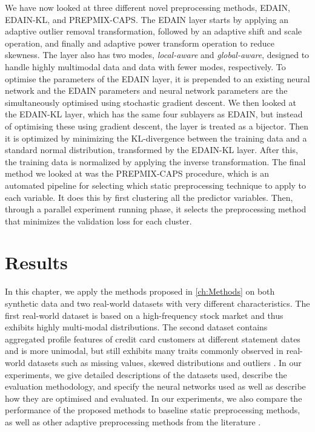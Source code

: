 \documentclass{statsmsc}
\begin{document}
{We have now looked at three different novel preprocessing methods,
\ac{EDAIN}, \ac{EDAIN-KL}, and \ac{PREPMIX-CAPS}. The \ac{EDAIN} layer starts by applying
an adaptive outlier removal transformation, followed by an adaptive shift and scale operation,
and finally and adaptive power transform operation to reduce skewness. The layer also has
two modes, \textit{local-aware} and \textit{global-aware}, designed to handle highly
multimodal data and data with fewer modes, respectively. To optimise the parameters of
the \ac{EDAIN} layer, it is prepended to an existing neural network and the
\ac{EDAIN} parameters and neural network parameters are the simultaneously optimised using
stochastic gradient descent. We then looked at the \ac{EDAIN-KL} layer, which has the same
four sublayers as \ac{EDAIN}, but instead of optimising these using gradient descent, the layer
is treated as a bijector. Then it is optimized by minimizing the \ac{KL-divergence} between the
training data and a standard  normal distribution, transformed by the \ac{EDAIN-KL} layer.
After this, the training data is normalized by applying the inverse transformation.
The final method we looked at was the \ac{PREPMIX-CAPS} procedure, which is an automated
pipeline for selecting which static preprocessing technique to apply to each variable. It does this
by first clustering all the predictor variables. Then, through a parallel experiment
running phase, it selects the preprocessing method that minimizes the validation loss for each
cluster.


\chapter{Results} %
\label{ch:Results}


In this chapter, we apply the methods proposed in \cref{ch:Methods} on both
synthetic data and two real-world datasets with very different characteristics.
The first real-world dataset is based on a high-frequency stock market and thus
exhibits highly multi-modal distributions.  The second dataset contains
aggregated profile features of credit card customers at different statement
dates and is more unimodal, but still exhibits many traits commonly observed in
real-world datasets such as missing values, skewed distributions and outliers
\citep{nawi,brits}.  In our experiments, we give detailed descriptions of the
datasets used, describe the evaluation methodology, and specify the neural
networks used as well as describe how they are optimised and evaluated. In our
experiments, we also compare the performance of the proposed methods to
baseline static preprocessing methods, as well as other adaptive preprocessing
methods from the literature \citep{dain,bin}.

}
\end{document}
